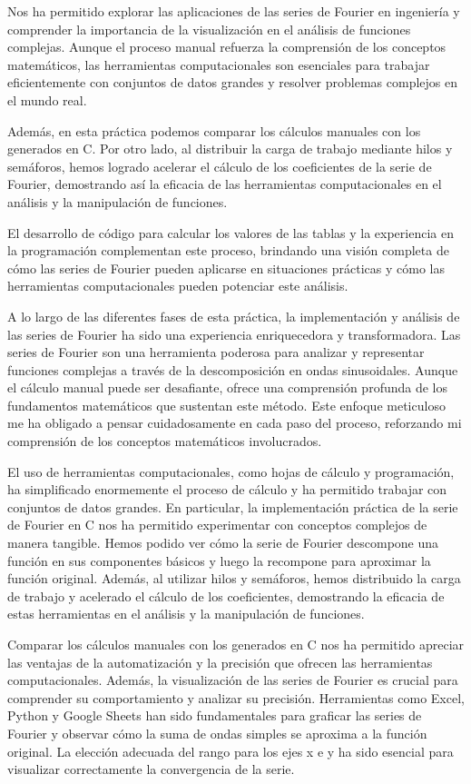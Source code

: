 Nos ha permitido explorar las aplicaciones de las series de Fourier en ingeniería y comprender la importancia de la visualización en el análisis de funciones complejas. Aunque el proceso manual refuerza la comprensión de los conceptos matemáticos, las herramientas computacionales son esenciales para trabajar eficientemente con conjuntos de datos grandes y resolver problemas complejos en el mundo real.

Además, en esta práctica podemos comparar los cálculos manuales con los generados en C. Por otro lado, al distribuir la carga de trabajo mediante hilos y semáforos, hemos logrado acelerar el cálculo de los coeficientes de la serie de Fourier, demostrando así la eficacia de las herramientas computacionales en el análisis y la manipulación de funciones.

El desarrollo de código para calcular los valores de las tablas y la experiencia en la programación complementan este proceso, brindando una visión completa de cómo las series de Fourier pueden aplicarse en situaciones prácticas y cómo las herramientas computacionales pueden potenciar este análisis.

A lo largo de las diferentes fases de esta práctica, la implementación y análisis de las series de Fourier ha sido una experiencia enriquecedora y transformadora. Las series de Fourier son una herramienta poderosa para analizar y representar funciones complejas a través de la descomposición en ondas sinusoidales. Aunque el cálculo manual puede ser desafiante, ofrece una comprensión profunda de los fundamentos matemáticos que sustentan este método. Este enfoque meticuloso me ha obligado a pensar cuidadosamente en cada paso del proceso, reforzando mi comprensión de los conceptos matemáticos involucrados.

El uso de herramientas computacionales, como hojas de cálculo y programación, ha simplificado enormemente el proceso de cálculo y ha permitido trabajar con conjuntos de datos grandes. En particular, la implementación práctica de la serie de Fourier en C nos ha permitido experimentar con conceptos complejos de manera tangible. Hemos podido ver cómo la serie de Fourier descompone una función en sus componentes básicos y luego la recompone para aproximar la función original. Además, al utilizar hilos y semáforos, hemos distribuido la carga de trabajo y acelerado el cálculo de los coeficientes, demostrando la eficacia de estas herramientas en el análisis y la manipulación de funciones.

Comparar los cálculos manuales con los generados en C nos ha permitido apreciar las ventajas de la automatización y la precisión que ofrecen las herramientas computacionales. Además, la visualización de las series de Fourier es crucial para comprender su comportamiento y analizar su precisión. Herramientas como Excel, Python y Google Sheets han sido fundamentales para graficar las series de Fourier y observar cómo la suma de ondas simples se aproxima a la función original. La elección adecuada del rango para los ejes x e y ha sido esencial para visualizar correctamente la convergencia de la serie.

